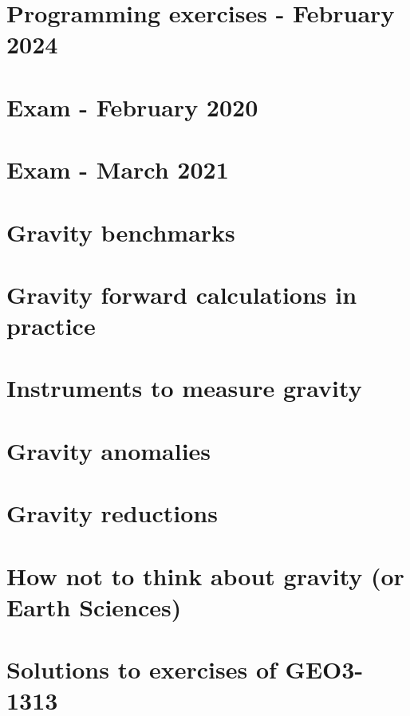 \section{Programming exercises - February 2024 \label{exgravptmass}} 

\newpage
\section{Exam - February 2020} 
\newpage
\section{Exam - March 2021} 


\section{Gravity benchmarks} 

\newpage
\section{Gravity forward calculations in practice} 
\section{Instruments to measure gravity} 
\section{Gravity anomalies} 
\section{Gravity reductions} 
\section{How not to think about gravity (or Earth Sciences)} 

\newpage
\section{Solutions to exercises of GEO3-1313 \label{app:gravsols}} 
